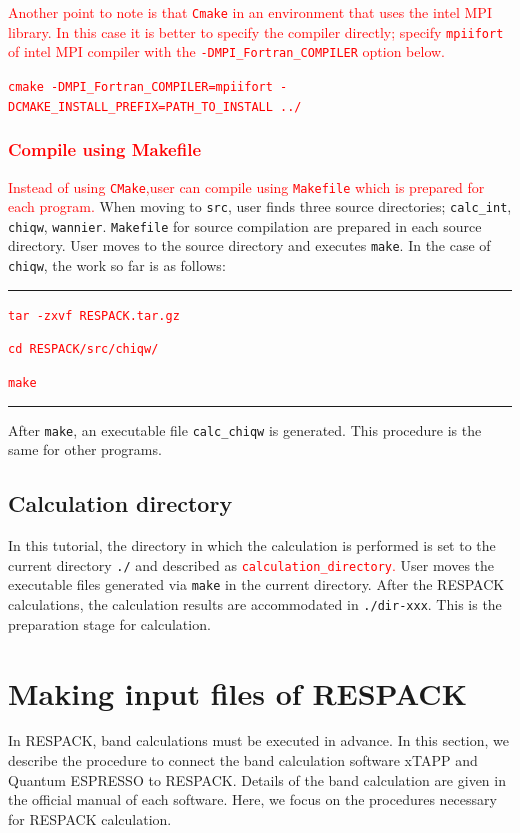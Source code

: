 \documentclass{article}
\newcommand{\tr}[1]{\textcolor{red}{#1}}
\begin{document}
\tr{Another point to note is that {\tt Cmake} in an environment that uses the {\sc intel MPI} library. In this case it is better to specify the compiler directly; specify {\tt mpiifort} of {\sc intel MPI} compiler with the {\tt -DMPI\_Fortran\_COMPILER} option below.}

\tr{\texttt{cmake -DMPI\_Fortran\_COMPILER=mpiifort -DCMAKE\_INSTALL\_PREFIX=PATH\_TO\_INSTALL ../}} 

\subsubsection{\tr{Compile using Makefile}}
\tr{Instead of using {\tt CMake},user can compile using {\tt Makefile} which is prepared for each program.} When moving to {\tt src}, user finds three source directories; {\tt calc\_int}, {\tt chiqw}, {\tt wannier}.  {\tt Makefile} for source compilation are prepared in each source directory. User moves to the source directory and executes {\tt make}. In the case of \verb+chiqw+, the work so far is as follows: 
\vspace{3mm}\hrule\vspace{3mm}
\tr{{\tt tar -zxvf RESPACK.tar.gz}} 

\tr{{\tt cd RESPACK/src/chiqw/}}  

\tr{{\tt make}} 
\vspace{3mm}\hrule\vspace{3mm}
After \verb+make+, an executable file \verb+calc_chiqw+ is generated. This procedure is the same for other programs.

\subsection{Calculation directory}
In this tutorial, the directory in which the calculation is performed is set to the current directory {\tt ./} and described as \tr{{\tt calculation\_directory}.} User moves the executable files generated via {\tt make} in the current directory. After the RESPACK calculations, the calculation results are accommodated in {\tt ./dir-xxx}. This is the preparation stage for calculation.

\clearpage 

\section{\label{gendirwfn}Making input files of RESPACK} 

In RESPACK, band calculations must be executed in advance. In this section, we describe the procedure to connect the band calculation software {\sc xTAPP} and {\sc Quantum ESPRESSO} to RESPACK. Details of the band calculation are given in the official manual of each software. Here, we focus on the procedures necessary for {\sc RESPACK} calculation.
\end{document}
